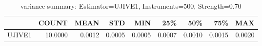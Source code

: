 \begin{table}[ht]
\centering
\caption{variance summary: Estimator=UJIVE1, Instruments=500, Strength=0.70}
\begin{tabular}{lrrrrrrrr}
\toprule
 & COUNT & MEAN & STD & MIN & 25\% & 50\% & 75\% & MAX \\
\midrule
UJIVE1 & 10.0000 & 0.0012 & 0.0005 & 0.0005 & 0.0007 & 0.0010 & 0.0015 & 0.0020 \\
\bottomrule
\end{tabular}
\end{table}

